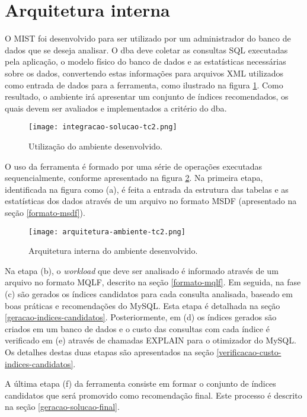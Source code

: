 \section{Arquitetura interna}
\label{arquitetura-interna}

O MIST foi desenvolvido para ser utilizado por um administrador do banco de dados que se deseja analisar. O \gls{dba} deve coletar as consultas SQL executadas pela aplicação, o modelo físico do banco de dados e as estatísticas necessárias sobre os dados, convertendo estas informações para arquivos XML utilizados como entrada de dados para a ferramenta, como ilustrado na figura \ref{fig:integracao-solucao}. Como resultado, o ambiente irá apresentar um conjunto de índices recomendados, os quais devem ser avaliados e implementados a critério do \gls{dba}.

\begin{figure}[H]
  \centering
  \caption{Utilização do ambiente desenvolvido.}
  \texttt{[image: integracao-solucao-tc2.png]}
  \label{fig:integracao-solucao}
\end{figure}

O uso da ferramenta é formado por uma série de operações executadas sequencialmente, conforme apresentado na figura \ref{fig:arquitetura-ambiente}. Na primeira etapa, identificada na figura como (a), é feita a entrada da estrutura das tabelas e as estatísticas dos dados através de um arquivo no formato MSDF (apresentado na seção \ref{formato-msdf}).

\begin{figure}[!ht]
  \centering
  \caption{Arquitetura interna do ambiente desenvolvido.}
  \texttt{[image: arquitetura-ambiente-tc2.png]}
  \label{fig:arquitetura-ambiente}
\end{figure}

Na etapa (b), o \textit{workload} que deve ser analisado é informado através de um arquivo no formato MQLF, descrito na seção \ref{formato-mqlf}. Em seguida, na fase (c) são gerados os índices candidatos para cada consulta analisada, baseado em boas práticas e recomendações do MySQL. Esta etapa é detalhada na seção \ref{geracao-indices-candidatos}. Posteriormente, em (d) os índices gerados são criados em um banco de dados e o custo das consultas com cada índice é verificado em (e) através de chamadas EXPLAIN para o otimizador do MySQL. Os detalhes destas duas etapas são apresentados na seção \ref{verificacao-custo-indices-candidatos}.

A última etapa (f) da ferramenta consiste em formar o conjunto de índices candidatos que será promovido como recomendação final. Este processo é descrito na seção \ref{geracao-solucao-final}.